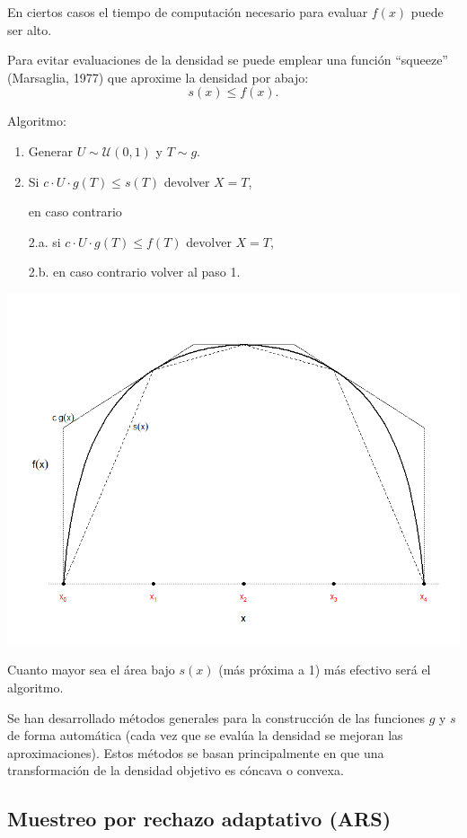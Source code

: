 \documentclass[
]{book}
\theoremstyle{break}
\theoremstyle{definition}
\theoremstyle{definition}
\theoremstyle{definition}
\theoremstyle{definition}
\theoremstyle{remark}
\begin{document}
En ciertos casos el tiempo de computación necesario para evaluar \(f(x)\) puede ser alto.

Para evitar evaluaciones de la densidad se puede emplear una función ``squeeze'' (Marsaglia, 1977) que aproxime la densidad por abajo:
\[s(x)\leq f(x).\]

Algoritmo:

\begin{enumerate}
\def\labelenumi{\arabic{enumi}.}
\item
  Generar \(U \sim \mathcal{U}(0, 1)\) y \(T\sim g\).
\item
  Si \(c\cdot U\cdot g\left( T\right) \leq s\left( T\right)\) devolver \(X=T\),

  en caso contrario

  2.a. si \(c\cdot U\cdot g\left( T\right) \leq f\left( T\right)\)
  devolver \(X=T\),

  2.b. en caso contrario volver al paso 1.
\end{enumerate}

\begin{center}\includegraphics[width=0.7\linewidth]{images/squeeze} \end{center}

Cuanto mayor sea el área bajo \(s(x)\) (más próxima a 1)
más efectivo será el algoritmo.

Se han desarrollado métodos generales para la construcción de las
funciones \(g\) y \(s\) de forma automática
(cada vez que se evalúa la densidad se mejoran las aproximaciones).
Estos métodos se basan principalmente en que una transformación de
la densidad objetivo es cóncava o convexa.

\hypertarget{muestreo-por-rechazo-adaptativo-ars}{%
\subsection{Muestreo por rechazo adaptativo (ARS)}\label{muestreo-por-rechazo-adaptativo-ars}}
\end{document}
